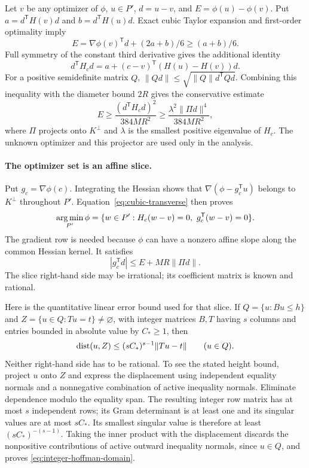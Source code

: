 Let $v$ be any optimizer of $\phi$, $u\in P'$, $d=u-v$, and
$E=\phi(u)-\phi(v)$. Put
$a=d^{\mathsf T}H(v)d$ and $b=d^{\mathsf T}H(u)d$.
Exact cubic Taylor expansion and first-order optimality imply
\[
 E=\nabla\phi(v)^{\mathsf T}d+(2a+b)/6\ge(a+b)/6.
\]
Full symmetry of the constant third derivative gives the additional
identity
\[
 d^{\mathsf T}H_cd
 =a+(c-v)^{\mathsf T}(H(u)-H(v))d.
\]
For a positive semidefinite matrix $Q$,
$\|Qd\|\le\sqrt{\|Q\|d^{\mathsf T}Qd}$.
Combining this inequality with the diameter bound $2R$ gives the
conservative estimate
\begin{equation}
 E\ge\frac{(d^{\mathsf T}H_cd)^2}{384MR^2}
 \ge\frac{\lambda^2\|\Pi d\|^4}{384MR^2},
 \label{eq:cubic-transverse}
\end{equation}
where $\Pi$ projects onto $K^\perp$ and $\lambda$ is the smallest
positive eigenvalue of $H_c$. The unknown optimizer and this projector
are used only in the analysis.

\paragraph{The optimizer set is an affine slice.}
Put $g_c=\nabla\phi(c)$. Integrating the Hessian shows that
$\nabla(\phi-g_c^{\mathsf T}u)$ belongs to $K^\perp$ throughout
$P'$. Equation~\eqref{eq:cubic-transverse} then proves
\begin{equation}
 \operatorname*{arg\,min}_{P'}\phi
 =\{w\in P':H_c(w-v)=0,\ g_c^{\mathsf T}(w-v)=0\}.
 \label{eq:cubic-slice}
\end{equation}
The gradient row is needed because $\phi$ can have a nonzero affine
slope along the common Hessian kernel. It satisfies
\[
 |g_c^{\mathsf T}d|\le E+MR\|\Pi d\|.
\]
The slice right-hand side may be irrational; its coefficient matrix
is known and rational.

Here is the quantitative linear error bound used for that slice.
If $Q=\{u:Bu\le h\}$ and
$Z=\{u\in Q:Tu=t\}\ne\varnothing$, with integer matrices
$B,T$ having $s$ columns and entries bounded in absolute value by
$C_*\ge1$, then
\begin{equation}
 \operatorname{dist}(u,Z)\le(sC_*)^{s-1}\|Tu-t\|\qquad(u\in Q).
 \label{eq:integer-hoffman-domain}
\end{equation}
Neither right-hand side has to be rational. To see the stated height
bound, project $u$ onto $Z$ and express the displacement using
independent equality normals and a nonnegative combination of active
inequality normals. Eliminate dependence modulo the equality span.
The resulting integer row matrix has at most $s$ independent rows;
its Gram determinant is at least one and its singular values are at
most $sC_*$. Its smallest singular value is therefore at least
$(sC_*)^{-(s-1)}$. Taking the inner product with the displacement
discards the nonpositive contributions of active outward inequality
normals, since $u\in Q$, and proves
\eqref{eq:integer-hoffman-domain}.

